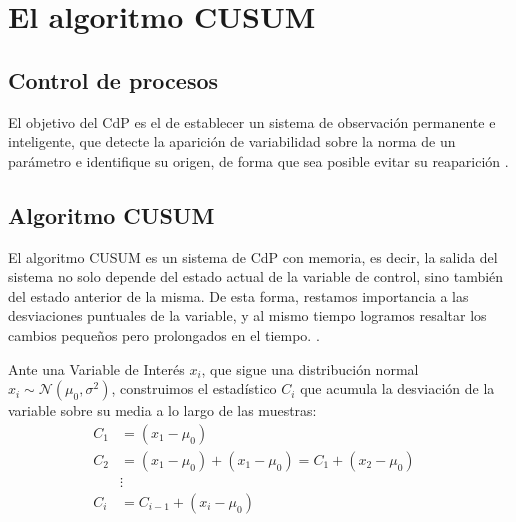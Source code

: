 \section{El algoritmo CUSUM}\label{sec:CUSUM}

\subsection{Control de procesos}
El objetivo del \gls{CdP} es el de establecer un sistema de observación permanente e inteligente,
que detecte la aparición de variabilidad sobre la norma de un parámetro e identifique su origen, de forma que 
sea posible evitar su reaparición \cite{Control_de_procesos}. %

\subsection{Algoritmo CUSUM}
El algoritmo CUSUM es un sistema de \gls{CdP} con memoria, es decir, la salida del
sistema no solo depende del estado actual de la variable de control, sino también del
estado anterior de la misma. De esta forma, restamos importancia a las desviaciones 
puntuales de la variable, y al mismo tiempo logramos resaltar los cambios pequeños
pero prolongados en el tiempo. \cite{CUSUM_Carlos_III}.

Ante una Variable de Interés $x_i$, que sigue una distribución normal 
$x_i \sim\mathcal{N}\left(\mu_0,\sigma^2\right)$, 
construimos el estadístico $C_i$ que acumula la desviación de la variable sobre su media
a lo largo de las muestras:
\begin{align*}
 C_1 &= (x_1 - \mu_0) \nonumber\\
 C_2 &= (x_1 - \mu_0) + (x_1 - \mu_0) = C_1 + (x_2-\mu_0) \nonumber\\
 &\vdots& \nonumber\\
 C_i &= C_{i-1} + (x_i-\mu_0)
\end{align*}

